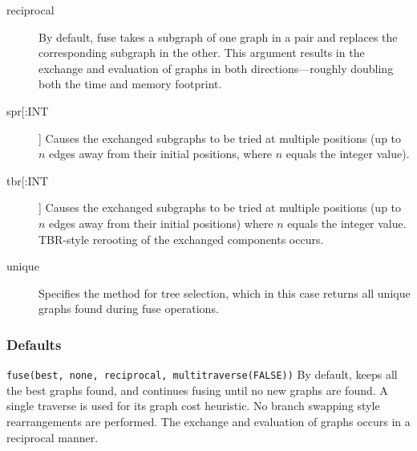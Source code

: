 \begin{description}
\begin{description}
		\end{description}
		
		\item [reciprocal] By default, fuse takes a subgraph of one graph in a pair and replaces the 
		corresponding subgraph in the other. This argument results in the exchange and evaluation 
		of graphs in both directions---roughly doubling both the time and memory footprint.
		
		\item [spr[:INT]] Causes the exchanged subgraphs to be tried at multiple positions (up to 
		$n$ edges away from their initial positions, where $n$ equals the integer value).
		
		
		\item [tbr[:INT]] Causes the exchanged subgraphs to be tried at multiple positions (up to 
		$n$ edges away from their initial positions) where $n$ equals the integer value. TBR-style 
		rerooting of the exchanged components occurs.
		
		\item [unique] Specifies the method for tree selection, which in this case returns all unique 
		graphs found during fuse operations.	
		
	\end{description}	
	
	\subsubsection{Defaults}
		\texttt{fuse(best, none, reciprocal, multitraverse(FALSE))} By default, \phyg keeps all the best 
		graphs found, and continues fusing until no new graphs are found. A single traverse is 
		used for its graph cost heuristic. No branch swapping style rearrangements 
		are performed. The exchange and evaluation of graphs occurs in a reciprocal manner. 
			
